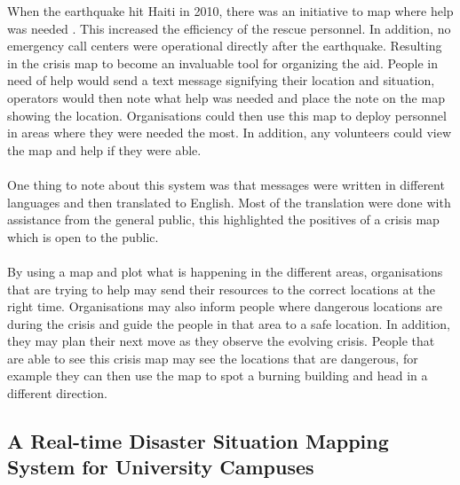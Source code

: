 When the earthquake hit Haiti in 2010, there was an initiative to map where help was needed \cite{usha}. This increased the efficiency of the rescue personnel. In addition, no emergency call centers were operational directly after the earthquake. Resulting in the crisis map to become an invaluable tool for organizing the aid. People in need of help would send a text message signifying their location and situation, operators would then note what help was needed and place the note on the map showing the location. Organisations could then use this map to deploy personnel in areas where they were needed the most. In addition, any volunteers could view the map and help if they were able.
\\\\
One thing to note about this system was that messages were written in different languages and then translated to English. Most of the translation were done with assistance from the general public, this highlighted the positives of a crisis map which is open to the public.
\\\\
By using a map and plot what is happening in the different areas, organisations that are trying to help may send their resources to the correct locations at the right time. Organisations may also inform people where dangerous locations are during the crisis and guide the people in that area to a safe location. In addition, they may plan their next move as they observe the evolving crisis. People that are able to see this crisis map may see the locations that are dangerous, for example they can then use the map to spot a burning building and head in a different direction. 

\subsection{A Real-time Disaster Situation Mapping System for University Campuses}

